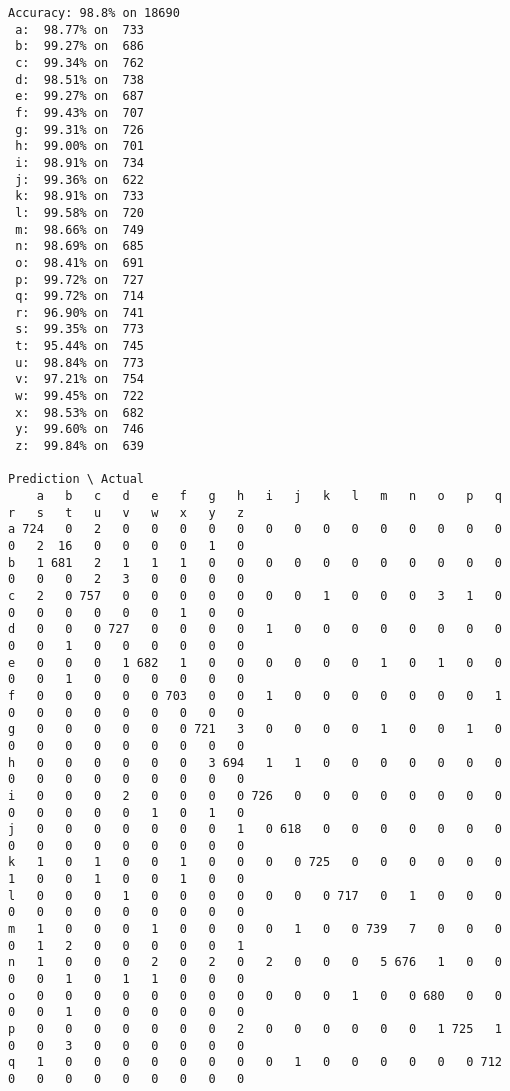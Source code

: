 \documentclass[12pt]{article}
\begin{document}
\begin{tiny}
\begin{verbatim}
Accuracy: 98.8% on 18690
 a:  98.77% on  733
 b:  99.27% on  686
 c:  99.34% on  762
 d:  98.51% on  738
 e:  99.27% on  687
 f:  99.43% on  707
 g:  99.31% on  726
 h:  99.00% on  701
 i:  98.91% on  734
 j:  99.36% on  622
 k:  98.91% on  733
 l:  99.58% on  720
 m:  98.66% on  749
 n:  98.69% on  685
 o:  98.41% on  691
 p:  99.72% on  727
 q:  99.72% on  714
 r:  96.90% on  741
 s:  99.35% on  773
 t:  95.44% on  745
 u:  98.84% on  773
 v:  97.21% on  754
 w:  99.45% on  722
 x:  98.53% on  682
 y:  99.60% on  746
 z:  99.84% on  639

Prediction \ Actual
    a   b   c   d   e   f   g   h   i   j   k   l   m   n   o   p   q   r   s   t   u   v   w   x   y   z
a 724   0   2   0   0   0   0   0   0   0   0   0   0   0   0   0   0   0   2  16   0   0   0   0   1   0
b   1 681   2   1   1   1   0   0   0   0   0   0   0   0   0   0   0   0   0   0   2   3   0   0   0   0
c   2   0 757   0   0   0   0   0   0   0   1   0   0   0   3   1   0   0   0   0   0   0   0   1   0   0
d   0   0   0 727   0   0   0   0   1   0   0   0   0   0   0   0   0   0   0   1   0   0   0   0   0   0
e   0   0   0   1 682   1   0   0   0   0   0   0   1   0   1   0   0   0   0   1   0   0   0   0   0   0
f   0   0   0   0   0 703   0   0   1   0   0   0   0   0   0   0   1   0   0   0   0   0   0   0   0   0
g   0   0   0   0   0   0 721   3   0   0   0   0   1   0   0   1   0   0   0   0   0   0   0   0   0   0
h   0   0   0   0   0   0   3 694   1   1   0   0   0   0   0   0   0   0   0   0   0   0   0   0   0   0
i   0   0   0   2   0   0   0   0 726   0   0   0   0   0   0   0   0   0   0   0   0   0   1   0   1   0
j   0   0   0   0   0   0   0   1   0 618   0   0   0   0   0   0   0   0   0   0   0   0   0   0   0   0
k   1   0   1   0   0   1   0   0   0   0 725   0   0   0   0   0   0   1   0   0   1   0   0   1   0   0
l   0   0   0   1   0   0   0   0   0   0   0 717   0   1   0   0   0   0   0   0   0   0   0   0   0   0
m   1   0   0   0   1   0   0   0   0   1   0   0 739   7   0   0   0   0   1   2   0   0   0   0   0   1
n   1   0   0   0   2   0   2   0   2   0   0   0   5 676   1   0   0   0   0   1   0   1   1   0   0   0
o   0   0   0   0   0   0   0   0   0   0   0   1   0   0 680   0   0   0   0   1   0   0   0   0   0   0
p   0   0   0   0   0   0   0   2   0   0   0   0   0   0   1 725   1   0   0   3   0   0   0   0   0   0
q   1   0   0   0   0   0   0   0   0   1   0   0   0   0   0   0 712   0   0   0   0   0   0   0   0   0

\end{verbatim}
\end{tiny}
\end{document}
